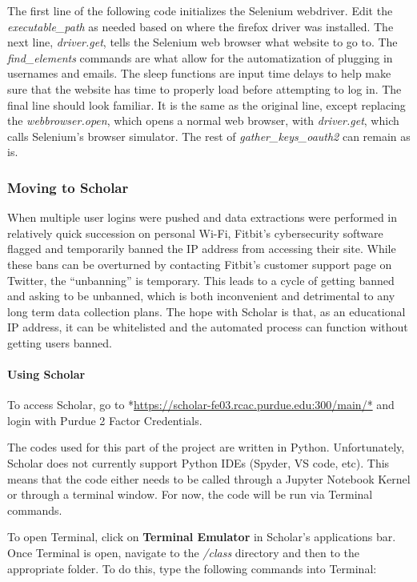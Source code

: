 \documentclass[]{book}
\let\oldparagraph\paragraph
\renewcommand{\paragraph}[1]{\oldparagraph{#1}\mbox{}}
\begin{document}
The first line of the following code initializes the Selenium webdriver.
Edit the \emph{executable\_path} as needed based on where the firefox
driver was installed. The next line, \emph{driver.get}, tells the
Selenium web browser what website to go to. The \emph{find\_elements}
commands are what allow for the automatization of plugging in usernames
and emails. The sleep functions are input time delays to help make sure
that the website has time to properly load before attempting to log in.
The final line should look familiar. It is the same as the original
line, except replacing the \emph{webbrowser.open}, which opens a normal
web browser, with \emph{driver.get}, which calls Selenium's browser
simulator. The rest of \emph{gather\_keys\_oauth2} can remain as is.

\subsubsection{Moving to Scholar}\label{moving-to-scholar}

When multiple user logins were pushed and data extractions were
performed in relatively quick succession on personal Wi-Fi, Fitbit's
cybersecurity software flagged and temporarily banned the IP address
from accessing their site. While these bans can be overturned by
contacting Fitbit's customer support page on Twitter, the ``unbanning''
is temporary. This leads to a cycle of getting banned and asking to be
unbanned, which is both inconvenient and detrimental to any long term
data collection plans. The hope with Scholar is that, as an educational
IP address, it can be whitelisted and the automated process can function
without getting users banned.

\paragraph{Using Scholar}\label{using-scholar}

To access Scholar, go to
*\url{https://scholar-fe03.rcac.purdue.edu:300/main/*} and login with
Purdue 2 Factor Credentials.

The codes used for this part of the project are written in Python.
Unfortunately, Scholar does not currently support Python IDEs (Spyder,
VS code, etc). This means that the code either needs to be called
through a Jupyter Notebook Kernel or through a terminal window. For now,
the code will be run via Terminal commands.

To open Terminal, click on \textbf{Terminal Emulator} in Scholar's
applications bar. Once Terminal is open, navigate to the \emph{/class}
directory and then to the appropriate folder. To do this, type the
following commands into Terminal:
\end{document}
